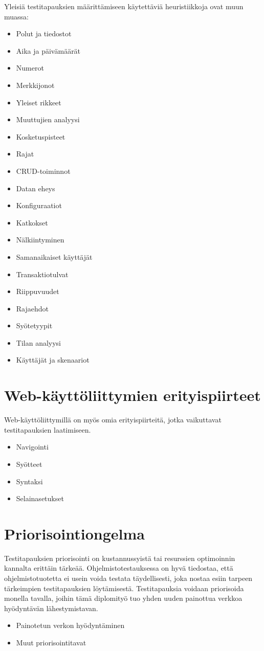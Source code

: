 Yleisiä testitapauksien määrittämiseen käytettäviä heuristiikkoja ovat muun muassa:
\begin{itemize}
  \item Polut ja tiedostot
  \item Aika ja päivämäärät
  \item Numerot
  \item Merkkijonot
  \item Yleiset rikkeet
  \item Muuttujien analyysi
  \item Kosketuspisteet
  \item Rajat
  \item CRUD-toiminnot
  \item Datan eheys
  \item Konfiguraatiot
  \item Katkokset
  \item Nälkiintyminen
  \item Samanaikaiset käyttäjät
  \item Transaktiotulvat
  \item Riippuvuudet
  \item Rajaehdot
  \item Syötetyypit
  \item Tilan analyysi
  \item Käyttäjät ja skenaariot
\end{itemize}

\section{Web-käyttöliittymien erityispiirteet}

Web-käyttöliittymillä on myös omia erityispiirteitä, jotka vaikuttavat testitapauksien laatimiseen.
\begin{itemize}
  \item Navigointi
  \item Syötteet
  \item Syntaksi
  \item Selainasetukset
\end{itemize}

\section{Priorisointiongelma}

Testitapauksien priorisointi on kustannussyistä tai resurssien optimoinnin kannalta erittäin tärkeää.
Ohjelmistotestauksessa on hyvä tiedostaa, että ohjelmistotuotetta ei usein voida testata täydellisesti, joka nostaa esiin tarpeen tärkeimpien testitapauksien löytämisestä.
Testitapauksia voidaan priorisoida monella tavalla, joihin tämä diplomityö tuo yhden uuden painottua verkkoa hyödyntävän lähestymistavan.
\begin{itemize}
  \item Painotetun verkon hyödyntäminen
  \item Muut priorisointitavat
\end{itemize}
